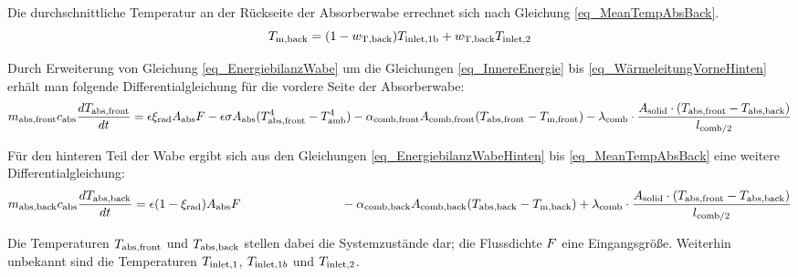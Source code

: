 Die durchschnittliche Temperatur an der Rückseite der Absorberwabe errechnet sich nach Gleichung \ref{eq_MeanTempAbsBack}.
\begin{equation} \label{eq_MeanTempAbsBack}
    T_{\mathrm{m,back}}  = (1-w_{\mathrm{T,back}}) T_{\mathrm{inlet,}\mathrm{1b}} + w_{\mathrm{T,back}} T_{\mathrm{inlet,}2}
\end{equation}
 \pagebreak

Durch Erweiterung von Gleichung \ref{eq_EnergiebilanzWabe} um die Gleichungen \ref{eq_InnereEnergie} bis \ref{eq_WärmeleitungVorneHinten} erhält man folgende Differentialgleichung für die vordere Seite der Absorberwabe:
\setlength{\eqlinespacing}{25pt}
\begin{dmath} \label{eq_GesamtgleichungEnergiebilanzWabeVorne}
    m_{\mathrm{abs,front}}  c_{\mathrm{abs}} \frac{d \TAbsorberFront}{d t} = \epsilon \xi_{\mathrm{rad}} \SurfaceFront \FluxSolar -  \epsilon \sigma \SurfaceFront (\TAbsorberFront^4-\TAmbient^4) - \HeatTransferCoefficientAbsorberFront \HeatTransferSurfaceFront (\TAbsorberFront-T_{\mathrm{m,front}}) - \lambda_{\mathrm{comb}} \cdot \frac{\SurfaceFrontSolid \cdot (\TAbsorberFront-\TAbsorberBack)}{l_{\mathrm{comb}/2}}
\end{dmath}

Für den hinteren Teil der Wabe ergibt sich aus den Gleichungen \ref{eq_EnergiebilanzWabeHinten} bis \ref{eq_MeanTempAbsBack} eine weitere Differentialgleichung:
\setlength{\eqlinespacing}{25pt}
\begin{dmath} \label{eq_GesamtgleichungEnergiebilanzWabeHinten}
    m_{\mathrm{abs,back}}  c_{\mathrm{abs}} \frac{d \TAbsorberBack}{d t} = \epsilon (1-\xi_{\mathrm{rad}}) \SurfaceFront \FluxSolar \qquad \qquad \qquad \qquad -  \HeatTransferCoefficientAbsorberBack \HeatTransferSurfaceBack (\TAbsorberBack-T_{\mathrm{m,back}}) + \lambda_{\mathrm{comb}} \cdot \frac{\SurfaceFrontSolid \cdot (\TAbsorberFront-\TAbsorberBack)}{l_{\mathrm{comb}/2}}
\end{dmath}


Die Temperaturen $T_{\mathrm{abs,front}}$ und $T_{\mathrm{abs,back}}$ stellen dabei die Systemzustände dar; die Flussdichte $F$ eine Eingangsgröße.
Weiterhin unbekannt sind die Temperaturen $T_{\mathrm{inlet,}1}$, $T_{\mathrm{inlet,}1b}$ und $T_{\mathrm{inlet,}2}$.

